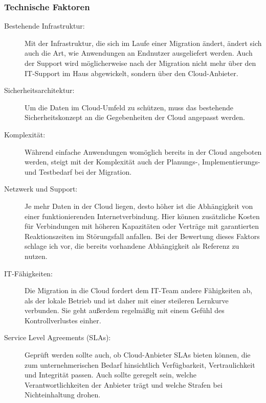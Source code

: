 \subsubsection{Technische Faktoren}
\begin{description}
	\item[Bestehende Infrastruktur:] Mit der Infrastruktur, die sich im 
Laufe einer Migration ändert, ändert sich auch die Art, wie Anwendungen an 
Endnutzer ausgeliefert werden. Auch der Support wird möglicherweise nach der 
Migration nicht mehr über den IT-Support im Haus abgewickelt, sondern über den 
Cloud-Anbieter. 
	\item[Sicherheitsarchitektur:] Um die Daten im Cloud-Umfeld zu 
schützen, muss das bestehende Sicherheitskonzept an die Gegebenheiten der Cloud 
angepasst werden.
	\item[Komplexität:]
	Während einfache Anwendungen womöglich bereits in der Cloud angeboten 
werden, steigt mit der Komplexität auch der Planungs-, Implementierungs- 
und Testbedarf bei der Migration.
	\item[Netzwerk und Support:] Je mehr Daten in der Cloud liegen, desto 
höher ist die Abhängigkeit von einer funktionierenden Internetverbindung. Hier 
können zusätzliche Kosten für Verbindungen mit höheren Kapazitäten oder 
Verträge mit garantierten Reaktionszeiten im Störungsfall anfallen. Bei der 
Bewertung dieses Faktors schlage ich vor, die bereits vorhandene Abhängigkeit 
als Referenz zu nutzen. 
	\item[IT-Fähigkeiten:] Die Migration in die Cloud fordert dem IT-Team 
andere Fähigkeiten ab, als der lokale Betrieb und ist daher mit einer steileren 
Lernkurve verbunden. Sie geht außerdem regelmäßig mit einem Gefühl des 
Kontrollverlustes einher. 
	\item[Service Level Agreements (SLAs):] Geprüft werden sollte auch, ob 
Cloud-Anbieter SLAs bieten können, die zum unternehmerischen Bedarf 
hinsichtlich Verfügbarkeit, Vertraulichkeit und Integrität passen. Auch sollte 
geregelt sein, welche Verantwortlichkeiten der Anbieter trägt und welche 
Strafen bei Nichteinhaltung drohen.
\end{description}


